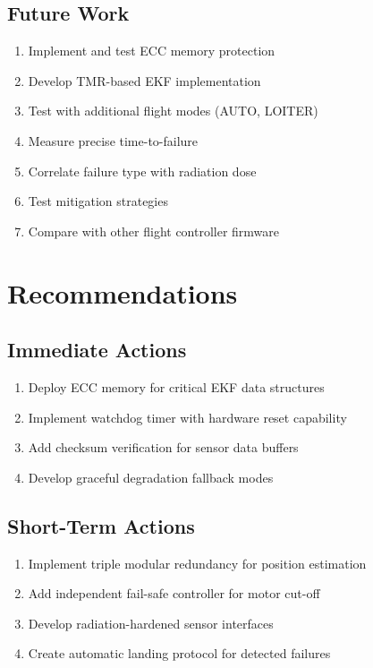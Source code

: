 \documentclass[11pt,a4paper]{article}
\begin{document}
\subsection{Future Work}

\begin{enumerate}
  \item Implement and test ECC memory protection
  \item Develop TMR-based EKF implementation
  \item Test with additional flight modes (AUTO, LOITER)
  \item Measure precise time-to-failure
  \item Correlate failure type with radiation dose
  \item Test mitigation strategies
  \item Compare with other flight controller firmware
\end{enumerate}

\section{Recommendations}

\subsection{Immediate Actions}

\begin{enumerate}[label=\arabic*)]
  \item Deploy ECC memory for critical EKF data structures
  \item Implement watchdog timer with hardware reset capability
  \item Add checksum verification for sensor data buffers
  \item Develop graceful degradation fallback modes
\end{enumerate}

\subsection{Short-Term Actions}

\begin{enumerate}[label=\arabic*)]
  \item Implement triple modular redundancy for position estimation
  \item Add independent fail-safe controller for motor cut-off
  \item Develop radiation-hardened sensor interfaces
  \item Create automatic landing protocol for detected failures
\end{enumerate}
\end{document}
